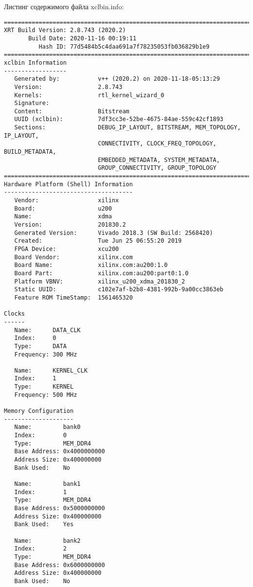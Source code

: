 Листинг содержимого файла xclbin.info:
\begin{lstlisting}[label=some-code-1,caption=Содержимое файла xclbin.info]
==============================================================================
XRT Build Version: 2.8.743 (2020.2)
       Build Date: 2020-11-16 00:19:11
          Hash ID: 77d5484b5c4daa691a7f78235053fb036829b1e9
==============================================================================
xclbin Information
------------------
   Generated by:           v++ (2020.2) on 2020-11-18-05:13:29
   Version:                2.8.743
   Kernels:                rtl_kernel_wizard_0
   Signature:              
   Content:                Bitstream
   UUID (xclbin):          7df3cc3e-52be-4675-84ae-559c42cf1893
   Sections:               DEBUG_IP_LAYOUT, BITSTREAM, MEM_TOPOLOGY, IP_LAYOUT, 
                           CONNECTIVITY, CLOCK_FREQ_TOPOLOGY, BUILD_METADATA, 
                           EMBEDDED_METADATA, SYSTEM_METADATA, 
                           GROUP_CONNECTIVITY, GROUP_TOPOLOGY
==============================================================================
Hardware Platform (Shell) Information
-------------------------------------
   Vendor:                 xilinx
   Board:                  u200
   Name:                   xdma
   Version:                201830.2
   Generated Version:      Vivado 2018.3 (SW Build: 2568420)
   Created:                Tue Jun 25 06:55:20 2019
   FPGA Device:            xcu200
   Board Vendor:           xilinx.com
   Board Name:             xilinx.com:au200:1.0
   Board Part:             xilinx.com:au200:part0:1.0
   Platform VBNV:          xilinx_u200_xdma_201830_2
   Static UUID:            c102e7af-b2b8-4381-992b-9a00cc3863eb
   Feature ROM TimeStamp:  1561465320

Clocks
------
   Name:      DATA_CLK
   Index:     0
   Type:      DATA
   Frequency: 300 MHz

   Name:      KERNEL_CLK
   Index:     1
   Type:      KERNEL
   Frequency: 500 MHz

Memory Configuration
--------------------
   Name:         bank0
   Index:        0
   Type:         MEM_DDR4
   Base Address: 0x4000000000
   Address Size: 0x400000000
   Bank Used:    No

   Name:         bank1
   Index:        1
   Type:         MEM_DDR4
   Base Address: 0x5000000000
   Address Size: 0x400000000
   Bank Used:    Yes

   Name:         bank2
   Index:        2
   Type:         MEM_DDR4
   Base Address: 0x6000000000
   Address Size: 0x400000000
   Bank Used:    No


\end{lstlisting}
